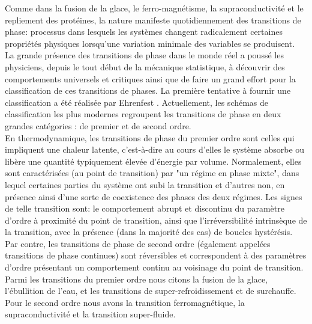 Comme dans la fusion de la glace, le ferro-magnétisme, la supraconductivité et le repliement des protéines, la nature manifeste quotidiennement des transitions de phase: processus dans lesquels les systèmes changent radicalement certaines propriétés physiques lorsqu'une variation minimale des variables se produisent.\\
La grande présence des transitions de phase dans le monde réel a poussé les physiciens, depuis le tout début de la mécanique statistique, à découvrir des comportements universels et critiques ainsi que de faire un grand effort pour la classification de ces transitions de phases. La première tentative à fournir une classification a été réalisée par Ehrenfest \cite{Ehrenfest1933}.  Actuellement, les schémas de classification les plus modernes regroupent les transitions de phase en deux grandes catégories : de premier et de second ordre.\\
En thermodynamique, les transitions de phase du premier ordre sont celles qui impliquent une chaleur latente, c'est-à-dire au cours d'elles le système absorbe ou libère une quantité typiquement élevée d'énergie par volume. Normalement, elles sont caractérisées (au point de transition) par "un régime en phase mixte", dans lequel certaines parties du système ont subi la transition et d'autres non, en présence ainsi d'une sorte de coexistence des phases des deux régimes. Les signes de telle transition sont: le comportement abrupt et discontinu du paramètre d'ordre à proximité du point de transition, ainsi que l'irréversibilité intrinsèque de la transition, avec la présence (dans la majorité des cas) de boucles hystérésis. Par contre, les transitions de phase de second ordre (également appelées transitions de phase continues) sont réversibles et correspondent à des paramètres d'ordre présentant un comportement continu au voisinage du point de transition.
Parmi les transitions du premier ordre nous citons la fusion de la glace, l'ébullition de l'eau, et les transitions de super-refroidissement et de surchauffe. Pour le second ordre nous avons la transition ferromagnétique, la supraconductivité et la transition super-fluide.
